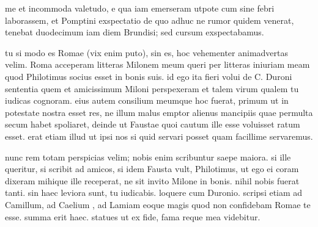 


 me et incommoda valetudo, e qua iam emerseram utpote cum sine febri laborassem, et Pomptini exspectatio de quo adhuc ne rumor quidem venerat, tenebat duodecimum iam diem Brundisi; sed cursum exspectabamus.

 tu si modo es Romae (vix enim puto), sin es, hoc vehementer animadvertas velim. Roma acceperam litteras Milonem meum queri per litteras iniuriam meam quod Philotimus socius esset in bonis suis. id ego ita fieri volui de C. Duroni sententia quem et amicissimum Miloni perspexeram et talem virum qualem tu iudicas cognoram. eius autem consilium meumque hoc fuerat, primum ut in potestate nostra esset res, ne illum malus emptor alienus mancipiis quae permulta secum habet spoliaret, deinde ut Faustae quoi cautum ille esse voluisset ratum esset. erat etiam illud ut ipsi nos si quid servari posset quam facillime servaremus.

 nunc rem totam perspicias velim; nobis enim scribuntur saepe maiora. si ille queritur, si scribit ad amicos, si idem Fausta vult, Philotimus, ut ego ei coram dixeram mihique ille receperat, ne sit invito Milone in bonis. nihil nobis fuerat tanti. sin haec leviora sunt, tu iudicabis. loquere cum Duronio. scripsi etiam ad Camillum, ad Caelium , ad Lamiam eoque magis quod non confidebam Romae te esse. summa erit haec. statues ut ex fide, fama reque mea videbitur.
